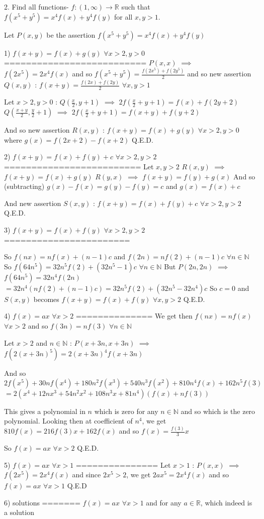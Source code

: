 \begin{solution}
	\begin{tcolorbox}
2. Find all functions- $ f : (1,\infty) \to \mathbb R $ such that  $f(x^5+y^5)=x^4f(x)+y^4f(y)$ for all $x,y>1$.\end{tcolorbox}


Let $P(x,y)$ be the assertion $f(x^5+y^5)=x^4f(x)+y^4f(y)$

1) $f(x+y)=f(x)+g(y)$ $\forall x>2,y>0$
==========================
$P(x,x)$ $\implies$ $f(2x^5)=2x^4f(x)$ and so $f(x^5+y^5)=\frac{f(2x^5)+f(2y^5)}2$ and so new assertion $Q(x,y)$ : $f(x+y)=\frac{f(2x)+f(2y)}2$ $\forall x,y>1$

Let $x>2,y>0$ : 
$Q(\frac x2,y+1)$ $\implies$ $2f(\frac x2+y+1)=f(x)+f(2y+2)$
$Q(\frac{x+y}2,\frac y2+1)$ $\implies$ $2f(\frac x2+y+1)=f(x+y)+f(y+2)$

And so new assertion $R(x,y)$ : $f(x+y)=f(x)+g(y)$ $\forall x>2,y>0$ where $g(x)=f(2x+2)-f(x+2)$
Q.E.D.

2) $f(x+y)=f(x)+f(y)+c$ $\forall x>2,y>2$
=========================
Let $x,y>2$
$R(x,y)$ $\implies$ $f(x+y)=f(x)+g(y)$
$R(y,x)$ $\implies$ $f(x+y)=f(y)+g(x)$
And so (subtracting) $g(x)-f(x)=g(y)-f(y)=c$ and $g(x)=f(x)+c$ 

And new assertion $S(x,y)$ : $f(x+y)=f(x)+f(y)+c$ $\forall x>2,y>2$
Q.E.D.

3) $f(x+y)=f(x)+f(y)$ $\forall x>2,y>2$
=======================

So $f(nx)=nf(x)+(n-1)c$ and $f(2n)=nf(2)+(n-1)c$ $\forall n\in\mathbb N$
So $f(64n^5)=32n^5f(2)+(32n^5-1)c$ $\forall n\in\mathbb N$
But $P(2n,2n)$ $\implies$ $f(64n^5)=32n^4f(2n)$ $=32n^4(nf(2)+(n-1)c)=32n^5f(2)+(32n^5-32n^4)c$
So $c=0$ and $S(x,y)$ becomes $f(x+y)=f(x)+f(y)$ $\forall x,y>2$
Q.E.D.

4) $f(x)=ax$ $\forall x>2$
==============
We get then $f(nx)=nf(x)$ $\forall x>2$ and so $f(3n)=nf(3)$ $\forall n\in\mathbb N$

Let $x>2$ and $n\in\mathbb N$ : $P(x+3n,x+3n)$ $\implies$ $f(2(x+3n)^5)=2(x+3n)^4f(x+3n)$

And so $2f(x^5)+30nf(x^4)+180n^2f(x^3)+540n^3f(x^2)+810n^4f(x)+162n^5f(3)$ $=2(x^4+12nx^3+54n^2x^2+108n^3x+81n^4)(f(x)+nf(3))$

This gives a polynomial in $n$ which is zero for any $n\in\mathbb N$ and so which is the zero polynomial.
Looking then at coefficient of $n^4$, we get $810f(x)=216f(3)x+162f(x)$ and so $f(x)=\frac{f(3)}3x$

So $f(x)=ax$ $\forall x>2$
Q.E.D.

5) $f(x)=ax$ $\forall x>1$
===============
Let $x>1$ : $P(x,x)$ $\implies$ $f(2x^5)=2x^4f(x)$ and since $2x^5>2$, we get $2ax^5=2x^4f(x)$ and so $f(x)=ax$ $\forall x>1$
Q.E.D

6) solutions
=======
$f(x)=ax$ $\forall x>1$ and for any $a\in\mathbb R$, which indeed is a solution
\end{solution}



